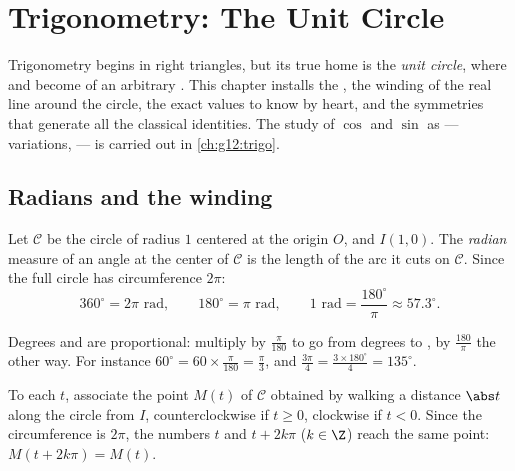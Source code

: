 \chapter{Trigonometry: The Unit Circle}\label{ch:g11:trigo}

Trigonometry begins in right triangles, but its true home is the
\emph{unit circle}, where  and  become  of an arbitrary
. This chapter installs the , the winding of the real
line around the circle, the exact values to know by heart, and the
symmetries that generate all the classical identities. The study of
$\cos$ and $\sin$ as  --- variations,  --- is carried
out in \cref{ch:g12:trigo}.

\section{Radians and the winding}

\begin{definition}[Radian]\label{def:g11:trigo:radian}
Let $\mathcal C$ be the circle of radius $1$ centered at the origin $O$,
and $I(1, 0)$. The \emph{radian} measure of an angle at the
center of $\mathcal C$ is the length of the arc it cuts on $\mathcal C$.
Since the full circle has circumference $2\pi$:
\[
360^\circ = 2\pi \text{ rad},
\qquad
180^\circ = \pi \text{ rad},
\qquad
1 \text{ rad} = \frac{180^\circ}{\pi} \approx 57.3^\circ .
\]
\end{definition}

\begin{method}[Converting]\label{met:g11:trigo:convert}
Degrees and  are proportional: multiply by $\frac{\pi}{180}$ to go
from degrees to , by $\frac{180}{\pi}$ the other way. For instance
$60^\circ = 60 \times \frac{\pi}{180} = \frac{\pi}{3}$, and
$\frac{3\pi}{4} = \frac{3 \times 180^\circ}{4} = 135^\circ$.
\end{method}

\begin{definition}\label{def:g11:trigo:winding}
To each  $t$, associate the point $M(t)$ of $\mathcal C$
obtained by walking a distance $\abs t$ along the circle from $I$,
counterclockwise if $t \geq 0$, clockwise if $t < 0$. Since the
circumference is $2\pi$, the numbers $t$ and $t + 2k\pi$ ($k \in \Z$)
reach the same point: $M(t + 2k\pi) = M(t)$.
\end{definition}

